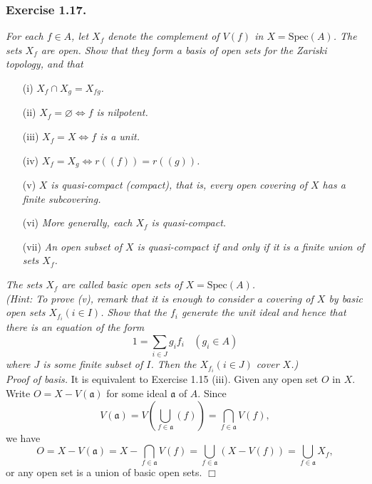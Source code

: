 \documentclass{article}
\begin{document}
\subsubsection*{Exercise 1.17.}
\emph{For each $f \in A$,
let $X_f$ denote the complement of $V(f)$ in $X = \mathrm{Spec}(A)$.
The sets $X_f$ are open.
Show that they form a basis of open sets for the Zariski topology, and that}
\begin{enumerate}
\item[(i)]
\emph{$X_f \cap X_g = X_{fg}$.}
\item[(ii)]
\emph{$X_f = \varnothing \Longleftrightarrow f$ is nilpotent.}
\item[(iii)]
\emph{$X_f = X \Longleftrightarrow f$ is a unit.}
\item[(iv)]
\emph{$X_f = X_g \Longleftrightarrow r((f)) = r((g))$.}
\item[(v)]
\emph{$X$ is quasi-compact (compact), that is,
every open covering of $X$ has a finite subcovering.}
\item[(vi)]
\emph{More generally, each $X_f$ is quasi-compact.}
\item[(vii)]
\emph{An open subset of $X$ is quasi-compact if and only if
it is a finite union of sets $X_f$.}
\end{enumerate}

\emph{The sets $X_f$ are called basic open sets of
$X = \mathrm{Spec}(A)$.} \\

\emph{(Hint: To prove (v), remark that it is enough to consider a covering of $X$
by basic open sets $X_{f_i} (i \in I)$.
Show that the $f_i$ generate the unit ideal and hence that
there is an equation of the form
$$1 = \sum_{i \in J} g_i f_i \:\:\:\: (g_i \in A)$$
where $J$ is some finite subset of $I$.
Then the $X_{f_i} (i \in J)$ cover $X$.)} \\



\emph{Proof of basis.}
It is equivalent to Exercise 1.15 (iii).
Given any open set $O$ in $X$.
Write $O = X - V(\mathfrak{a})$ for some ideal $\mathfrak{a}$ of $A$.
Since
$$V(\mathfrak{a})
= V \left( \bigcup_{f \in \mathfrak{a}} (f) \right)
= \bigcap_{f \in \mathfrak{a}} V(f),$$
we have
$$O
= X - V(\mathfrak{a})
= X - \bigcap_{f \in \mathfrak{a}} V(f)
= \bigcup_{f \in \mathfrak{a}} (X - V(f))
= \bigcup_{f \in \mathfrak{a}} X_f,$$
or any open set is a union of basic open sets.
$\Box$ \\
\end{document}
